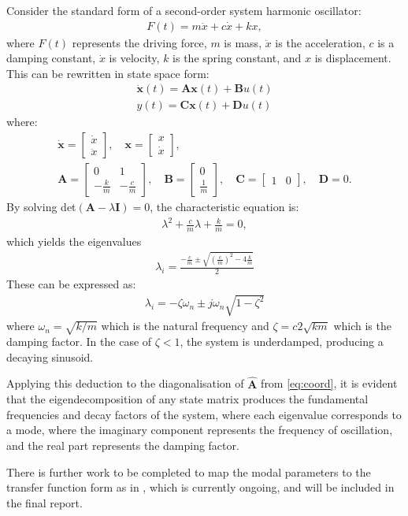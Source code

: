 Consider the standard form of a second-order system harmonic oscillator:
\begin{align}
    F(t) = m\ddot{x} + c\dot{x} + kx,
\end{align}
where $F(t)$ represents the driving force, $m$ is mass, $\ddot{x}$ is the acceleration, $c$ is a damping constant, $\dot{x}$ is velocity, $k$ is the spring constant, and $x$ is displacement. This can be rewritten in state space form:
\begin{align}
\dot{\mathbf{x}}(t) = \mathbf{A}\mathbf{x}(t) + \mathbf{B}u(t) \\
y(t) = \mathbf{C}\mathbf{x}(t) + \mathbf{D}u(t)
\end{align}
where:
\begin{gather}
\dot{\mathbf{x}} = \begin{bmatrix} \dot{x} \\ \ddot{x} \end{bmatrix}, \quad
\mathbf{x} = \begin{bmatrix} x \\ \dot{x} \end{bmatrix}, \\
\mathbf{A} = \begin{bmatrix} 0 & 1 \\ -\frac{k}{m} & -\frac{c}{m} \end{bmatrix}, \quad
\mathbf{B} = \begin{bmatrix} 0 \\ \frac{1}{m} \end{bmatrix}, \quad
\mathbf{C} = \begin{bmatrix} 1 & 0 \end{bmatrix}, \quad
\mathbf{D} = 0.
\end{gather}
By solving det$(\mathbf{A} - \lambda \mathbf{I}) = 0$, the characteristic equation is:
\begin{align}
\lambda^2 + \frac{c}{m} \lambda + \frac{k}{m} = 0,
\end{align}
which yields the eigenvalues
\begin{align}
\label{eq:eigs}
\lambda_i = \frac{-\frac{c}{m} \pm \sqrt{(\frac{c}{m})^2 - 4\frac{k}{m}}}{2}
\end{align}
These can be expressed as:
\begin{align}
\lambda_i = -\zeta\omega_n \pm j\omega_n\sqrt{1 - \zeta^2}
\end{align}
where $\omega_n = \sqrt{k/m}$ which is the natural frequency and $\zeta = {c}{2\sqrt{km}}$ which is the damping factor. In the case of $\zeta < 1$, the system is underdamped, producing a decaying sinusoid.

Applying this deduction to the diagonalisation of $\hat{\mathbf{A}}$ from \eqref{eq:coord}, it is evident that the eigendecomposition of any state matrix produces the fundamental frequencies and decay factors of the system, where each eigenvalue corresponds to a mode, where the imaginary component represents the frequency of oscillation, and the real part represents the damping factor.

There is further work to be completed to map the modal parameters to the transfer function form as in \cite{oneill}, which is currently ongoing, and will be included in the final report.